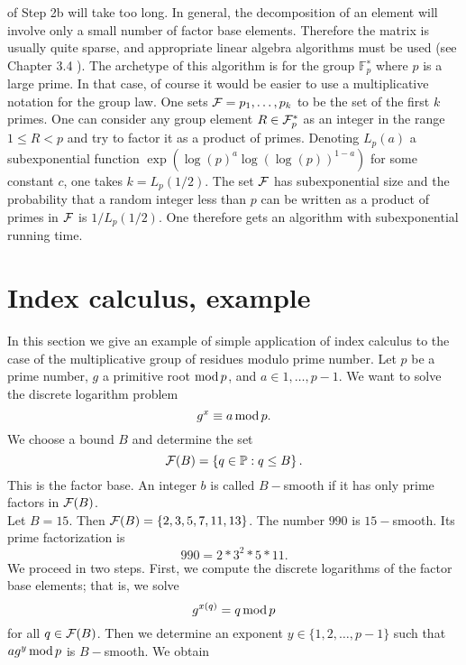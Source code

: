 \documentclass[12pt, letterpaper]{report}
\begin{document}
of Step 2b will take too long.
In general, the decomposition of an element will involve only a small number of
factor base elements. Therefore the matrix is usually quite sparse, and appropriate
linear algebra algorithms must be used (see Chapter 3.4 \cite{Joux}).
The archetype of this algorithm is for the group $\mathbb{F}^{∗}_{p}$
where $p$ is a large prime. In that
case, of course it would be easier to use a multiplicative notation for the group law. One
sets ${\cal F} = {p_1,\dots, p_k}$ to be the set of the first $k$ primes. One can consider any group
element $R \in {\cal F}^{*}_{p}$ as an integer in the range $1\le R < p$ and try to factor it as a product
of primes. Denoting $L_p(a)$ a subexponential function $\exp(\log(p)^{a}\log(\log(p))^{1-a})$ for
some constant $c$, one takes $k = L_p(1/2)$. The set ${\cal F}$ has subexponential size and the
probability that a random integer less than $p$ can be written as a product of primes in
${\cal F}$ is $1/L_p(1/2)$. One therefore gets an algorithm with subexponential running time.
\section{Index calculus, example}
In this section we give an example of simple application of index calculus to the case of the multiplicative group of 
residues modulo prime number. Let $p$ be a prime number, $g$ a primitive root $\mathop{\rm mod}{p}$, 
and $a \in {1,\dots, p-1}$. We want to solve the discrete logarithm problem
$$
g^x \equiv a \mathop{\rm mod}{p}.
$$
We choose a bound $B$ and determine the set
$$
{\cal F}(B) = \left\{q\in\mathbb{P} : q\le B \right\}.
$$
This is the factor base. An integer $b$ is called $B-$smooth if it has only prime factors in ${\cal F}(B)$.\\
Let $B = 15$. Then ${\cal F}(B) = \left\{ 2, 3, 5, 7,11, 13 \right\}$. The number $990$ is $15-$smooth. Its prime factorization is 
$$
990 = 2 * 3^2 * 5 * 11.
$$
We proceed in two steps. First, we compute the discrete
logarithms of the factor base elements; that is, we solve
$$
g^{x(q)} = q \mathop{\rm mod} p
$$
for all $q \in {\cal F}(B)$. Then we determine an exponent $y \in \{1, 2, \dots, p-1\}$
such that $ a g^y \mathop{\rm mod}{p}$ is $B-$smooth. We obtain
\end{document}
